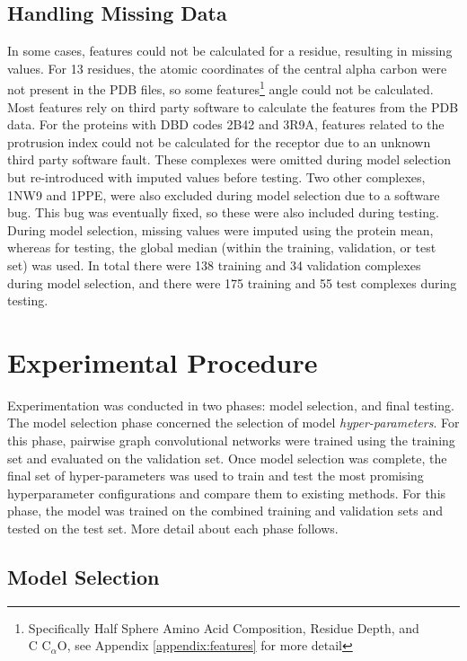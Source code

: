 \subsection{Handling Missing Data}
In some cases, features could not be calculated for a residue, resulting in missing values.
For 13 residues, the atomic coordinates of the central alpha carbon were not present in the PDB files, so some features\footnote{Specifically Half Sphere Amino Acid Composition, Residue Depth, and $\text{C C}_{\alpha} \text{O}$, see Appendix \ref{appendix:features} for more detail} angle could not be calculated.
Most features rely on third party software to calculate the features from the PDB data.
For the proteins with DBD codes 2B42 and 3R9A, features related to the protrusion index could not be calculated for the receptor due to an unknown third party software fault.
These complexes were omitted during model selection but re-introduced with imputed values before testing.
Two other complexes, 1NW9 and 1PPE, were also excluded during model selection due to a software bug.
This bug was eventually fixed, so these were also included during testing. 
During model selection, missing values were imputed using the protein mean, whereas for testing, the global median (within the training, validation, or test set) was used.
In total there were 138 training and 34 validation complexes during model selection, and there were 175 training and 55 test complexes during testing.

\section{Experimental Procedure}

Experimentation was conducted in two phases: model selection, and final testing.
The model selection phase concerned the selection of model \emph{hyper-parameters}.
For this phase, pairwise graph convolutional networks were trained using the training set and evaluated on the validation set.
Once model selection was complete, the final set of hyper-parameters was used to train and test the most promising hyperparameter configurations and compare them to existing methods.
For this phase, the model was trained on the combined training and validation sets and tested on the test set.
More detail about each phase follows.


\subsection{Model Selection}

